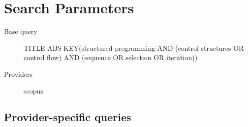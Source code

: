 \documentclass{article}
\begin{document}
\section{Search Parameters}

\begin{description}
\item[Base query] TITLE-ABS-KEY(\textquotedbl{}structured programming\textquotedbl{} AND (\textquotedbl{}control structures\textquotedbl{} OR \textquotedbl{}control flow\textquotedbl{}) AND (sequence OR selection OR iteration))
\item[Providers] scopus
\end{description}

\subsection{Provider-specific queries}
\end{document}
